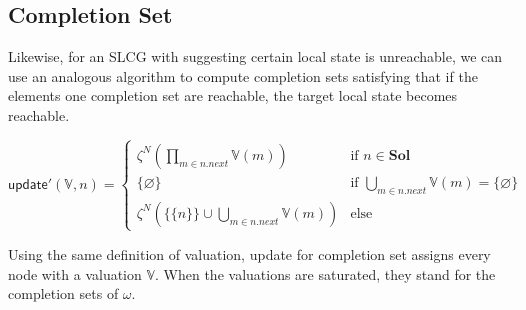 \subsection{Completion Set}
Likewise, for an SLCG with suggesting certain local state is unreachable, we can use an analogous algorithm to compute completion sets satisfying that if the elements one completion set are reachable, the target local state becomes reachable.

\begin{definition}
\begin{equation}  
\nonumber
\mathsf{update'}(\mathbb{V},n)= 
      \begin{cases}
            \zeta^N(\prod_{m\in n.next}\mathbb{V}(m))&\text{if } n\in\mathbf{Sol}\\
            \{\varnothing\}&\text{if }\bigcup_{m\in n.next}\mathbb{V}(m)=\{\varnothing\}\\
            \zeta^N(\{\{n\}\}\cup\bigcup_{m\in n.next}\mathbb{V}(m))&\text{else}
      \end{cases}
\end{equation}
\end{definition}

Using the same definition of valuation, \textsf{update for completion set} assigns every node with a valuation $\mathbb{V}$. 
When the valuations are saturated, they stand for the completion sets of $\omega$.

